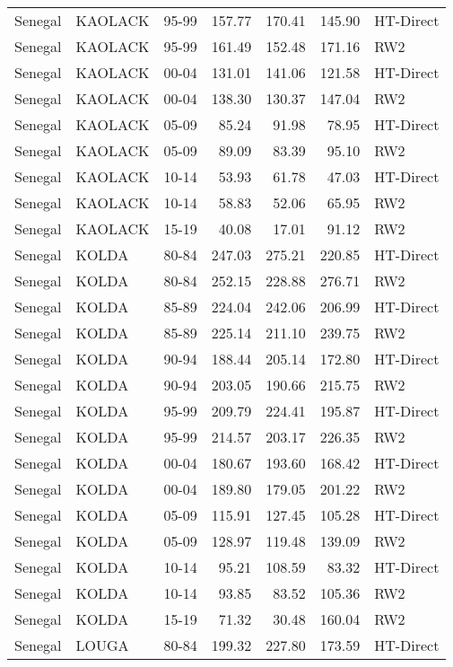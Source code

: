 \begin{longtable}{lllrrrl}
  Senegal & KAOLACK & 95-99 & 157.77 & 170.41 & 145.90 & HT-Direct \\ 
  Senegal & KAOLACK & 95-99 & 161.49 & 152.48 & 171.16 & RW2 \\ 
  Senegal & KAOLACK & 00-04 & 131.01 & 141.06 & 121.58 & HT-Direct \\ 
  Senegal & KAOLACK & 00-04 & 138.30 & 130.37 & 147.04 & RW2 \\ 
  Senegal & KAOLACK & 05-09 & 85.24 & 91.98 & 78.95 & HT-Direct \\ 
  Senegal & KAOLACK & 05-09 & 89.09 & 83.39 & 95.10 & RW2 \\ 
  Senegal & KAOLACK & 10-14 & 53.93 & 61.78 & 47.03 & HT-Direct \\ 
  Senegal & KAOLACK & 10-14 & 58.83 & 52.06 & 65.95 & RW2 \\ 
  Senegal & KAOLACK & 15-19 & 40.08 & 17.01 & 91.12 & RW2 \\ 
  Senegal & KOLDA & 80-84 & 247.03 & 275.21 & 220.85 & HT-Direct \\ 
  Senegal & KOLDA & 80-84 & 252.15 & 228.88 & 276.71 & RW2 \\ 
  Senegal & KOLDA & 85-89 & 224.04 & 242.06 & 206.99 & HT-Direct \\ 
  Senegal & KOLDA & 85-89 & 225.14 & 211.10 & 239.75 & RW2 \\ 
  Senegal & KOLDA & 90-94 & 188.44 & 205.14 & 172.80 & HT-Direct \\ 
  Senegal & KOLDA & 90-94 & 203.05 & 190.66 & 215.75 & RW2 \\ 
  Senegal & KOLDA & 95-99 & 209.79 & 224.41 & 195.87 & HT-Direct \\ 
  Senegal & KOLDA & 95-99 & 214.57 & 203.17 & 226.35 & RW2 \\ 
  Senegal & KOLDA & 00-04 & 180.67 & 193.60 & 168.42 & HT-Direct \\ 
  Senegal & KOLDA & 00-04 & 189.80 & 179.05 & 201.22 & RW2 \\ 
  Senegal & KOLDA & 05-09 & 115.91 & 127.45 & 105.28 & HT-Direct \\ 
  Senegal & KOLDA & 05-09 & 128.97 & 119.48 & 139.09 & RW2 \\ 
  Senegal & KOLDA & 10-14 & 95.21 & 108.59 & 83.32 & HT-Direct \\ 
  Senegal & KOLDA & 10-14 & 93.85 & 83.52 & 105.36 & RW2 \\ 
  Senegal & KOLDA & 15-19 & 71.32 & 30.48 & 160.04 & RW2 \\ 
  Senegal & LOUGA & 80-84 & 199.32 & 227.80 & 173.59 & HT-Direct \\ 

\end{longtable}
